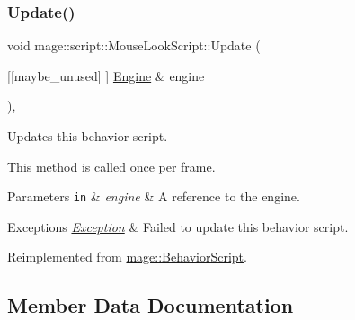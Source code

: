 \mbox{\label{classmage_1_1script_1_1_mouse_look_script_a3b78aebd104b061f5d176843ef58a48a}} 
\subsubsection{\texorpdfstring{Update()}{Update()}}
{\footnotesize\ttfamily void mage\+::script\+::\+Mouse\+Look\+Script\+::\+Update (\begin{DoxyParamCaption}\item[{\mbox{[}\mbox{[}maybe\+\_\+unused\mbox{]} \mbox{]} \mbox{\hyperlink{classmage_1_1_engine}{Engine}} \&}]{engine }\end{DoxyParamCaption})\hspace{0.3cm}{\ttfamily [override]}, {\ttfamily [virtual]}}

Updates this behavior script.

This method is called once per frame.


\begin{DoxyParams}[1]{Parameters}
\mbox{\tt in}  & {\em engine} & A reference to the engine. \\
\hline
\end{DoxyParams}

\begin{DoxyExceptions}{Exceptions}
{\em \mbox{\hyperlink{classmage_1_1_exception}{Exception}}} & Failed to update this behavior script. \\
\hline
\end{DoxyExceptions}


Reimplemented from \mbox{\hyperlink{classmage_1_1_behavior_script_a085634661326b59850c1111e537baa4e}{mage\+::\+Behavior\+Script}}.



\subsection{Member Data Documentation}
\mbox{\label{classmage_1_1script_1_1_mouse_look_script_ae41f05d545c70cd621a405f6ef0cd4d5}} 
